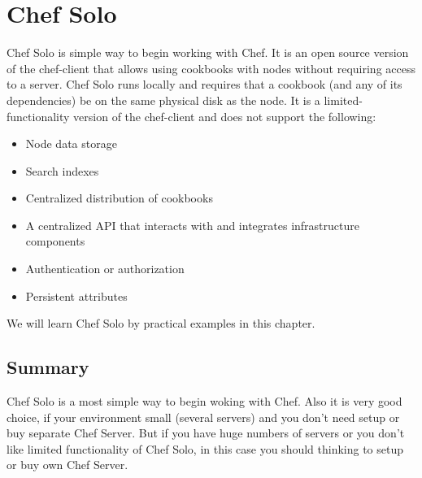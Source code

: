 \chapter{Chef Solo}

Chef Solo is simple way to begin working with Chef. It is an open source version of the chef-client that allows using cookbooks with nodes without requiring access to a server. Chef Solo runs locally and requires that a cookbook (and any of its dependencies) be on the same physical disk as the node. It is a limited-functionality version of the chef-client and does not support the following:

\begin{itemize}
  \item Node data storage
  \item Search indexes
  \item Centralized distribution of cookbooks
  \item A centralized API that interacts with and integrates infrastructure components
  \item Authentication or authorization
  \item Persistent attributes
\end{itemize}

We will learn Chef Solo by practical examples in this chapter.













\section{Summary}

Chef Solo is a most simple way to begin woking with Chef. Also it is very good choice, if your environment small (several servers) and you don't need setup or buy separate Chef Server. But if you have huge numbers of servers or you don't like limited functionality of Chef Solo, in this case you should thinking to setup or buy own Chef Server.